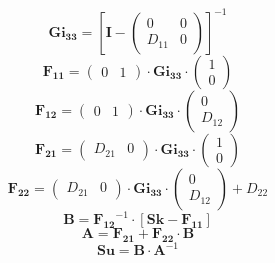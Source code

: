 \[ \mathbf{Gi_{33}} = \left[\mathbf{I} -\left(\begin{smallmatrix} 0 & 0 \\ D_{11} & 0 \end{smallmatrix}\right)\right]^{-1} \]
\[ \mathbf{F_{11}} = \left(\begin{smallmatrix} 0 & 1 \end{smallmatrix}\right) \cdot\mathbf{Gi_{33}}\cdot \left(\begin{smallmatrix} 1 \\ 0 \end{smallmatrix}\right) \]
\[ \mathbf{F_{12}} = \left(\begin{smallmatrix} 0 & 1 \end{smallmatrix}\right) \cdot\mathbf{Gi_{33}}\cdot \left(\begin{smallmatrix} 0 \\ D_{12} \end{smallmatrix}\right) \]
\[ \mathbf{F_{21}} = \left(\begin{smallmatrix} D_{21} & 0 \end{smallmatrix}\right) \cdot\mathbf{Gi_{33}}\cdot \left(\begin{smallmatrix} 1 \\ 0 \end{smallmatrix}\right) \]
\[ \mathbf{F_{22}} = \left(\begin{smallmatrix} D_{21} & 0 \end{smallmatrix}\right) \cdot\mathbf{Gi_{33}}\cdot \left(\begin{smallmatrix} 0 \\ D_{12} \end{smallmatrix}\right) + D_{22} \]
\[ \mathbf{B}=\mathbf{F_{12}}^{-1}\cdot\left[\mathbf{Sk}-\mathbf{F_{11}}\right] \]
\[ \mathbf{A}=\mathbf{F_{21}}+\mathbf{F_{22}}\cdot\mathbf{B} \]
\[ \mathbf{Su}=\mathbf{B}\cdot\mathbf{A}^{-1} \]
